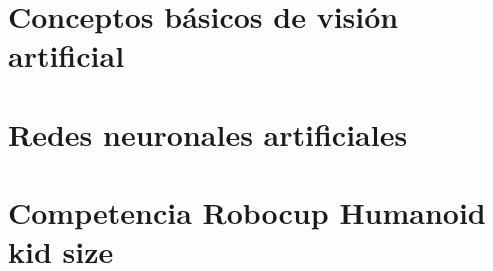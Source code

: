 \section{Conceptos básicos de visión artificial} 

\section{Redes neuronales artificiales}
    
\section{Competencia Robocup Humanoid kid size}
